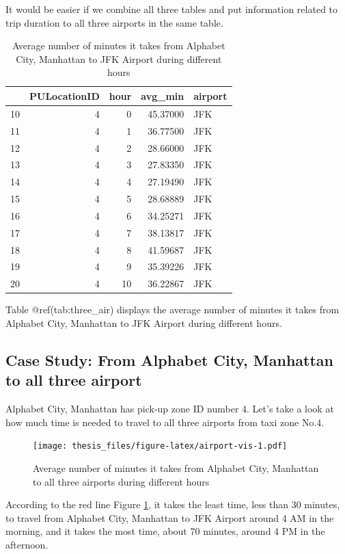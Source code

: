 \documentclass[12pt,twoside]{reedthesis}
\newenvironment{Shaded}{\begin{snugshade}}{\end{snugshade}}
\newcommand{\KeywordTok}[1]{\textcolor[rgb]{0.13,0.29,0.53}{\textbf{#1}}}
\newcommand{\DecValTok}[1]{\textcolor[rgb]{0.00,0.00,0.81}{#1}}
\newcommand{\StringTok}[1]{\textcolor[rgb]{0.31,0.60,0.02}{#1}}
\newcommand{\OperatorTok}[1]{\textcolor[rgb]{0.81,0.36,0.00}{\textbf{#1}}}
\newcommand{\NormalTok}[1]{#1}
\theoremstyle{definition}
\theoremstyle{definition}
\theoremstyle{definition}
\theoremstyle{remark}
\begin{document}
It would be easier if we combine all three tables and put information
related to trip duration to all three airports in the same table.
\begin{table}

\caption{\label{tab:unnamed-chunk-46}Average number of minutes it takes from Alphabet City, Manhattan to JFK Airport during different hours}
\centering
\begin{tabular}[t]{l|r|r|r|l}
\hline
  & PULocationID & hour & avg\_min & airport\\
\hline
10 & 4 & 0 & 45.37000 & JFK\\
\hline
11 & 4 & 1 & 36.77500 & JFK\\
\hline
12 & 4 & 2 & 28.66000 & JFK\\
\hline
13 & 4 & 3 & 27.83350 & JFK\\
\hline
14 & 4 & 4 & 27.19490 & JFK\\
\hline
15 & 4 & 5 & 28.68889 & JFK\\
\hline
16 & 4 & 6 & 34.25271 & JFK\\
\hline
17 & 4 & 7 & 38.13817 & JFK\\
\hline
18 & 4 & 8 & 41.59687 & JFK\\
\hline
19 & 4 & 9 & 35.39226 & JFK\\
\hline
20 & 4 & 10 & 36.22867 & JFK\\
\hline
\end{tabular}
\end{table}
Table @ref(tab:three\_air) displays the average number of minutes it
takes from Alphabet City, Manhattan to JFK Airport during different
hours.

\subsection{Case Study: From Alphabet City, Manhattan to all three
airport}\label{case-study-from-alphabet-city-manhattan-to-all-three-airport}

Alphabet City, Manhattan has pick-up zone ID number 4. Let's take a look
at how much time is needed to travel to all three airports from taxi
zone No.4.
\begin{Shaded}
\end{Shaded}
\begin{figure}
\centering
\texttt{[image: thesis\_files/figure-latex/airport-vis-1.pdf]}
\caption{\label{fig:airport-vis}Average number of minutes it takes from
Alphabet City, Manhattan to all three airports during different hours}
\end{figure}
According to the red line Figure \ref{fig:airport-vis}, it takes the
least time, less than 30 minutes, to travel from Alphabet City,
Manhattan to JFK Airport around 4 AM in the morning, and it takes the
most time, about 70 minutes, around 4 PM in the afternoon.
\end{document}
